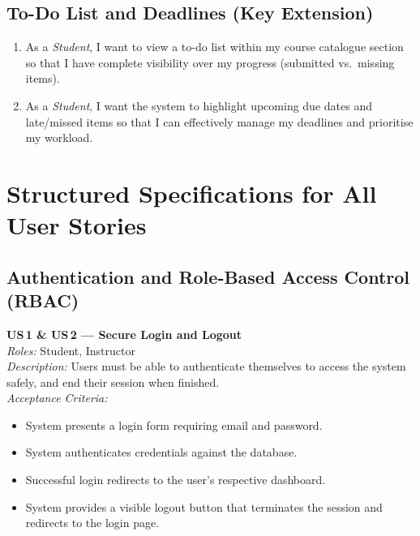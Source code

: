 \documentclass[12pt, a4paper]{article}
\begin{document}
\subsection{To-Do List and Deadlines \texorpdfstring{\normalfont\small(Key Extension)}{}}
\begin{enumerate}[label=\textbf{US\,\arabic*}, start=23]
  \item As a \emph{Student}, I want to view a to-do list within my course
        catalogue section so that I have complete visibility over my progress
        (submitted vs.\ missing items).
  \item As a \emph{Student}, I want the system to highlight upcoming due dates
        and late/missed items so that I can effectively manage my deadlines and
        prioritise my workload.
\end{enumerate}

\section{Structured Specifications for All User Stories}
\label{sec:specs}

\subsection{Authentication and Role-Based Access Control (RBAC)}

\begin{userstory}
  \textbf{US\,1 \& US\,2 — Secure Login and Logout}\\[4pt]
  \textit{Roles:} Student, Instructor\\[2pt]
  \textit{Description:} Users must be able to authenticate themselves to
  access the system safely, and end their session when finished.\\[4pt]
  \textit{Acceptance Criteria:}
  \begin{itemize}
    \item System presents a login form requiring email and password.
    \item System authenticates credentials against the database.
    \item Successful login redirects to the user's respective dashboard.
    \item System provides a visible logout button that terminates the session
          and redirects to the login page.
  \end{itemize}
\end{userstory}
\end{document}

